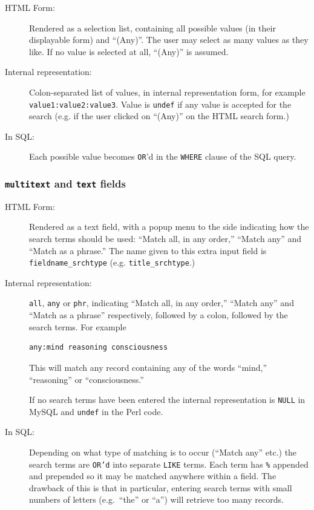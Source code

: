 \begin{description}
\item[HTML Form:] Rendered as a selection list, containing all possible values (in their displayable form) and ``(Any)''. The user may select as many values as they like. If no value is selected at all, ``(Any)'' is assumed.

\item[Internal representation:] Colon-separated list of values, in internal representation form, for example {\tt value1:value2:value3}. Value is {\tt undef} if any value is accepted for the search (e.g. if the user clicked on ``(Any)'' on the HTML search form.)

\item[In SQL:] Each possible value becomes {\tt OR}'d in the {\tt WHERE} clause of the SQL query.
\end{description}


\subsubsection{{\tt multitext} and {\tt text} fields}

\begin{description}

\item[HTML Form:] 
Rendered as a text field, with a popup menu to the side indicating how the search terms should be used: ``Match all, in any order,'' ``Match any'' and ``Match as a phrase.'' The name given to this extra input field is {\tt fieldname\_srchtype} (e.g. {\tt title\_srchtype}.)

\item[Internal representation:] {\tt all}, {\tt any} or {\tt phr}, indicating ``Match all, in any order,'' ``Match any'' and ``Match as a phrase'' respectively, followed by a colon, followed by the search terms. For example

\begin{verbatim}
any:mind reasoning consciousness
\end{verbatim}

This will match any record containing any of the words ``mind,'' ``reasoning'' or ``consciousness.''

If no search terms have been entered the internal representation is {\tt NULL} in MySQL and {\tt undef} in the Perl code.

\item[In SQL:] Depending on what type of matching is to occur (``Match any'' etc.) the search terms are {\tt OR'd} into separate {\tt LIKE} terms. Each term has {\tt \%} appended and prepended so it may be matched anywhere within a field. The drawback of this is that in particular, entering search terms with small numbers of letters (e.g.\ ``the'' or ``a'') will retrieve too many records.

\end{description}


